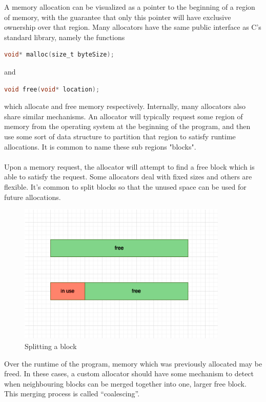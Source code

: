 \documentclass{article}
\begin{document}
A memory allocation can be visualized as a pointer to the beginning of a region of memory, with the guarantee that only this pointer will have exclusive ownership over that region. Many allocators have the same public interface as C's standard library, namely the functions \\
\begin{lstlisting}[language=C]
void* malloc(size_t byteSize);
\end{lstlisting}
and 
\begin{lstlisting}[language=C]
void free(void* location);
\end{lstlisting}
which allocate and free memory respectively. Internally, many allocators also share similar mechanisms. An allocator will typically request some region of memory from the operating system at the beginning of the program, and then use some sort of data structure to partition that region to satisfy runtime allocations. It is common to name these sub regions "blocks".\\
\\
Upon a memory request, the allocator will attempt to find a free block which is able to satisfy the request. Some allocators deal with fixed sizes and others are flexible. It's common to split blocks so that the unused space can be used for future allocations.
\\
\begin{figure}[htbp]
	\centering
	\includegraphics[width=10cm]{split}
	\captionsetup{width=10cm}
	\caption{Splitting a block}
\end{figure}
\pagebreak
Over the runtime of the program, memory which was previously allocated may be freed. In these cases, a custom allocator should have some mechanism to detect when neighbouring blocks can be merged together into one, larger free block. This merging process is called ``coalescing''.\\
\\
\end{document}
